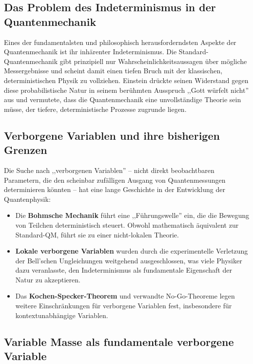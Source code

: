 \documentclass[12pt,a4paper]{article}  %
\begin{document}
	\subsection{Das Problem des Indeterminismus in der Quantenmechanik}
	
	Eines der fundamentalsten und philosophisch herausforderndsten Aspekte der Quantenmechanik ist ihr inhärenter Indeterminismus. Die Standard-Quantenmechanik gibt prinzipiell nur Wahrscheinlichkeitsaussagen über mögliche Messergebnisse und scheint damit einen tiefen Bruch mit der klassischen, deterministischen Physik zu vollziehen. Einstein drückte seinen Widerstand gegen diese probabilistische Natur in seinem berühmten Ausspruch ,,Gott würfelt nicht'' aus und vermutete, dass die Quantenmechanik eine unvollständige Theorie sein müsse, der tiefere, deterministische Prozesse zugrunde liegen.
	
	\subsection{Verborgene Variablen und ihre bisherigen Grenzen}
	
	Die Suche nach ,,verborgenen Variablen'' – nicht direkt beobachtbaren Parametern, die den scheinbar zufälligen Ausgang von Quantenmessungen determinieren könnten – hat eine lange Geschichte in der Entwicklung der Quantenphysik:
	
	\begin{itemize}
		\item Die \textbf{Bohmsche Mechanik} führt eine ,,Führungswelle'' ein, die die Bewegung von Teilchen deterministisch steuert. Obwohl mathematisch äquivalent zur Standard-QM, führt sie zu einer nicht-lokalen Theorie.
		
		\item \textbf{Lokale verborgene Variablen} wurden durch die experimentelle Verletzung der Bell'schen Ungleichungen weitgehend ausgeschlossen, was viele Physiker dazu veranlasste, den Indeterminismus als fundamentale Eigenschaft der Natur zu akzeptieren.
		
		\item Das \textbf{Kochen-Specker-Theorem} und verwandte No-Go-Theoreme legen weitere Einschränkungen für verborgene Variablen fest, insbesondere für kontextunabhängige Variablen.
	\end{itemize}
	
	\subsection{Variable Masse als fundamentale verborgene Variable}
	
\end{document}
